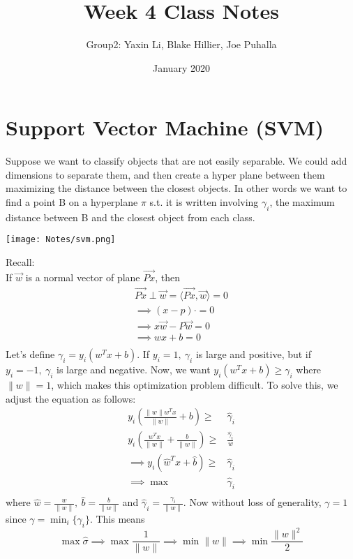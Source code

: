 \documentclass{article}
\title{Week 4 Class Notes}
\author{Group2: Yaxin Li, Blake Hillier, Joe Puhalla}
\date{January 2020}
\begin{document}
\maketitle

\section{Support Vector Machine (SVM)}
\begin{minipage}[]{0.5\textwidth}
    Suppose we want to classify objects that are not easily separable. We could add dimensions to separate them, and then create a hyper plane between them maximizing the distance between the closest objects. In other words we want to find a point B on a hyperplane $\pi$ s.t. it is written involving $\gamma_{i}$, the maximum distance between B and the closest object from each class. 
\end{minipage}
\begin{minipage}[]{0.5\textwidth}
    \texttt{[image: Notes/svm.png]}
\end{minipage}
Recall: \\
If $\vec{w}$ is a normal vector of plane $\vec{Px}$, then \begin{align*}
    \vec{Px}\perp\vec{w}=\langle\vec{Px},\vec{w}\rangle=0 \\
    \implies(x-p)\cdot=0 \\
    \implies x\vec{w}-P\vec{w}=0 \\
    \implies{w}x+b=0 \\
\end{align*}
Let's define $\gamma_{i}=y_{i}(w^{T}x+b)$. If $y_{i}=1, \ \gamma_{i}$ is large and positive, but if $y_{i}=-1, \ \gamma_{i}$ is large and negative. Now, we want $y_{i}(w^{T}x+b)\geq\gamma_{i}$ where $\|w\|=1$, which makes this optimization problem difficult. To solve this, we adjust the equation as follows: \begin{align*}
    y_{i}(\frac{\|w\|w^{T}x}{\|w\|}+b)\geq&\hat{\gamma}_{i} \\
    y_{i}(\frac{w^{T}x}{\|w\|}+\frac{b}{\|w\|})\geq&\frac{\hat{\gamma}_{i}}{w} \\
    \implies y_{i}(\hat{w}^{T}x+\hat{b})\geq&\hat{\gamma}_{i} \\
    \implies \max&\hat{\gamma}_{i} \\
\end{align*}
where $\hat{w}=\frac{w}{\|w\|}, \ \hat{b}=\frac{b}{\|w\|}$ and $\hat{\gamma}_{i}=\frac{\gamma_{i}}{\|w\|}$. Now without loss of generality, $\gamma=1$ since $\gamma=\min_{i}\{\gamma_{i}\}$. This means \begin{equation*}
    \max\hat{\sigma}\implies\max\frac{1}{\|w\|}\implies\min\|w\|\implies\min\frac{\|w\|^{2}}{2}
\end{equation*}
\end{document}
